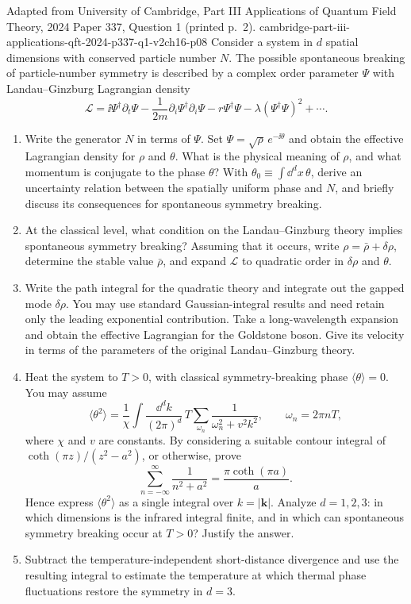 \begin{enumerate}
  {Adapted from University of Cambridge, Part III Applications of Quantum
  Field Theory, 2024 Paper 337, Question 1 (printed p.~2).}
  {cambridge-part-iii-applications-qft-2024-p337-q1-v2ch16-p08}
  Consider a system in \(d\) spatial dimensions with conserved particle
  number \(N\).  The possible spontaneous breaking of particle-number
  symmetry is described by a complex order parameter \(\Psi\) with
  Landau--Ginzburg Lagrangian density
  \[
    \mathcal L
      =\ii\Psi^\dagger\partial_t\Psi
       -\frac1{2m}\partial_i\Psi^\dagger\partial_i\Psi
       -r\Psi^\dagger\Psi
       -\lambda(\Psi^\dagger\Psi)^2+\cdots .
  \]
  \begin{enumerate}
    \item[(a)]
    Write the generator \(N\) in terms of \(\Psi\).  Set
    \(\Psi=\sqrt\rho\,e^{-\ii\theta}\) and obtain the effective Lagrangian
    density for \(\rho\) and \(\theta\).  What is the physical meaning of
    \(\rho\), and what momentum is conjugate to the phase \(\theta\)?  With
    \(\theta_0\equiv\int \dd^dx\,\theta\), derive an uncertainty relation
    between the spatially uniform phase and \(N\), and briefly discuss its
    consequences for spontaneous symmetry breaking.
    \item[(b)]
    At the classical level, what condition on the Landau--Ginzburg theory
    implies spontaneous symmetry breaking?  Assuming that it occurs, write
    \(\rho=\bar\rho+\delta\rho\), determine the stable value \(\bar\rho\),
    and expand \(\mathcal L\) to quadratic order in \(\delta\rho\) and
    \(\theta\).
    \item[(c)]
    Write the path integral for the quadratic theory and integrate out the
    gapped mode \(\delta\rho\).  You may use standard Gaussian-integral
    results and need retain only the leading exponential contribution.  Take
    a long-wavelength expansion and obtain the effective Lagrangian for the
    Goldstone boson.  Give its velocity in terms of the parameters of the
    original Landau--Ginzburg theory.
    \item[(d)]
    Heat the system to \(T>0\), with classical symmetry-breaking phase
    \(\langle\theta\rangle=0\).  You may assume
    \[
      \langle\theta^2\rangle
        =\frac1\chi\int\frac{\dd^dk}{(2\pi)^d}\,
          T\sum_{\omega_n}\frac1{\omega_n^2+v^2k^2},
      \qquad \omega_n=2\pi nT,
    \]
    where \(\chi\) and \(v\) are constants.  By considering a suitable
    contour integral of \(\coth(\pi z)/(z^2-a^2)\), or otherwise, prove
    \[
      \sum_{n=-\infty}^{\infty}\frac1{n^2+a^2}
        =\frac{\pi\coth(\pi a)}a.
    \]
    Hence express \(\langle\theta^2\rangle\) as a single integral over
    \(k=|\mathbf k|\).  Analyze \(d=1,2,3\): in which dimensions is the
    infrared integral finite, and in which can spontaneous symmetry breaking
    occur at \(T>0\)?  Justify the answer.
    \item[(e)]
    Subtract the temperature-independent short-distance divergence and use
    the resulting integral to estimate the temperature at which thermal
    phase fluctuations restore the symmetry in \(d=3\).
  \end{enumerate}


\end{enumerate}
